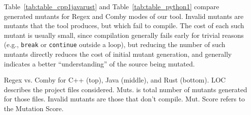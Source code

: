 \documentclass[acmsmall,screen,review,anonymous]{acmart}
\begin{document}
{Table~\ref{tab:table_cpp1javarust} and Table~\ref{tab:table_python1} compare generated
mutants for Regex and Comby modes of our tool.  Invalid
mutants are mutants that the tool produces, but which fail to
compile.  The cost of each such mutant is usually small,
since compilation generally fails early for trivial reasons (e.g.,
{\tt break} or {\tt continue} outside a loop), 
but reducing the number of such mutants directly reduces the cost of
initial mutant generation, and generally indicates a better
``understanding'' of the source being mutated.

\begin{table}[hbtp]
\centering
\footnotesize
\caption{Regex vs. Comby for C++ (top), Java (middle), and Rust (bottom). LOC describes the project files considered. Muts. is total number of mutants generated for those files. Invalid mutants are those that don't compile. Mut. Score refers to the Mutation Score.}
\label{tab:table_cpp1javarust}


\end{table}}
\end{document}
